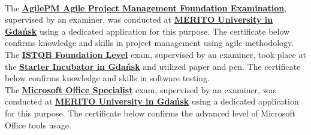 \documentclass[theme]{cv_einstein}
\begin{document}
\begin{paracol}{2}
\begin{rightcolumn}
            \vspace{\itemspace}\\
            {The \href{https://apmg-international.com/product/agilepm/foundation}{\textbf{AgilePM Agile Project Management Foundation Examination}}, supervised by an examiner, was conducted at \href{https://www.merito.pl/english/gdansk/}{\textbf{MERITO University in Gdańsk}} using a dedicated application for this purpose. The certificate below confirms knowledge and skills in project management using agile methodology.}
            \vspace{\itemspace}\\
            {The \href{https://www.istqb.org/certifications/certified-tester-foundation-level}{\textbf{ISTQB Foundation Level}} exam, supervised by an examiner, took place at the \href{https://inkubatorstarter.pl/}{\textbf{Starter Incubator in Gdańsk}} and utilized paper and pen. The certificate below confirms knowledge and skills in software testing.}
            \vspace{\itemspace}\\
            {The \href{https://support.microsoft.com/en-us/topic/earn-a-microsoft-office-specialist-mos-certification-0885c944-167c-51ea-1cdc-8f65952bd1b8}{\textbf{Microsoft Office Specialist}} exam, supervised by an examiner, was conducted at \href{https://www.merito.pl/english/gdansk/}{\textbf{MERITO University in Gdańsk}} using a dedicated application for this purpose. The certificate below confirms the advanced level of Microsoft Office tools usage.}
            \vspace{\itemspace}\\

\end{rightcolumn}
\end{paracol}
\end{document}
